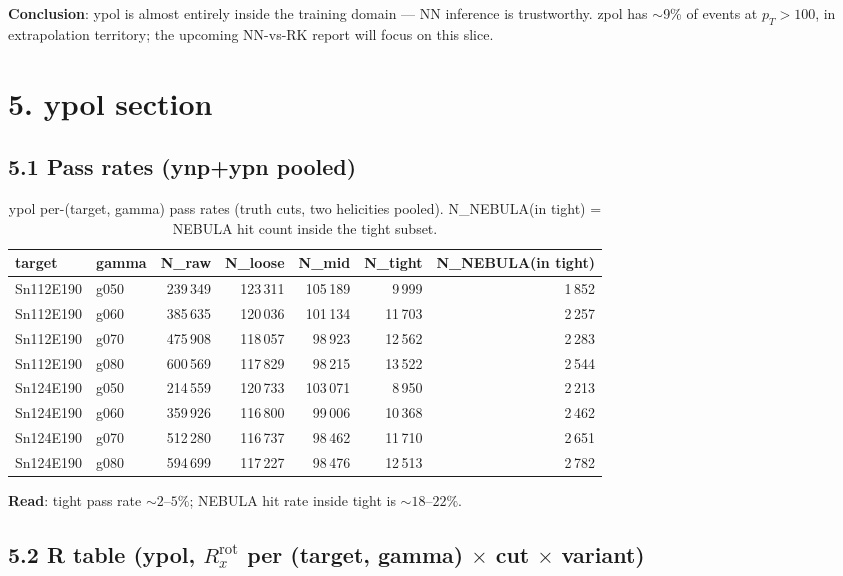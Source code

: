 \documentclass[a4paper,11pt]{article}
\begin{document}
\textbf{Conclusion}: ypol is almost entirely inside the training domain --- NN inference is trustworthy. zpol has $\sim$9\% of events at $p_T > 100$, in extrapolation territory; the upcoming NN-vs-RK report will focus on this slice.

\section{5. ypol section}

\subsection{5.1 Pass rates (ynp+ypn pooled)}

\begin{table}[H]
\centering\footnotesize
\caption{ypol per-(target, gamma) pass rates (truth cuts, two helicities pooled). N\_NEBULA(in tight) = NEBULA hit count inside the tight subset.}
\begin{tabular}{llrrrrr}
\toprule
target & gamma & N\_raw & N\_loose & N\_mid & N\_tight & N\_NEBULA(in tight) \\
\midrule
Sn112E190 & g050 & 239\,349 & 123\,311 & 105\,189 &  9\,999 & 1\,852 \\
Sn112E190 & g060 & 385\,635 & 120\,036 & 101\,134 & 11\,703 & 2\,257 \\
Sn112E190 & g070 & 475\,908 & 118\,057 &  98\,923 & 12\,562 & 2\,283 \\
Sn112E190 & g080 & 600\,569 & 117\,829 &  98\,215 & 13\,522 & 2\,544 \\
Sn124E190 & g050 & 214\,559 & 120\,733 & 103\,071 &  8\,950 & 2\,213 \\
Sn124E190 & g060 & 359\,926 & 116\,800 &  99\,006 & 10\,368 & 2\,462 \\
Sn124E190 & g070 & 512\,280 & 116\,737 &  98\,462 & 11\,710 & 2\,651 \\
Sn124E190 & g080 & 594\,699 & 117\,227 &  98\,476 & 12\,513 & 2\,782 \\
\bottomrule
\end{tabular}
\end{table}

\textbf{Read}: tight pass rate $\sim 2$--$5\%$; NEBULA hit rate inside tight is $\sim 18$--$22\%$.

\subsection{5.2 R table (ypol, $R_x^\text{rot}$ per (target, gamma) $\times$ cut $\times$ variant)}
\end{document}
